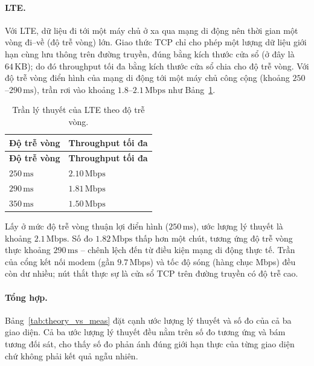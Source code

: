 \paragraph{LTE.}
Với LTE, dữ liệu đi tới một máy chủ ở xa qua mạng di động nên thời gian một vòng đi--về (độ trễ vòng) lớn. Giao thức TCP chỉ cho phép một lượng dữ liệu giới hạn cùng lưu thông trên đường truyền, đúng bằng kích thước cửa sổ (ở đây là $64\,\text{KB}$); do đó throughput tối đa bằng kích thước cửa sổ chia cho độ trễ vòng. Với độ trễ vòng điển hình của mạng di động tới một máy chủ công cộng (khoảng $250$--$290\,\text{ms}$), trần rơi vào khoảng $1{.}8$--$2{.}1\,\text{Mbps}$ như Bảng~\ref{tab:lte_theory}.

\begin{longtable}{|p{4cm}|p{4cm}|}
    \caption{Trần lý thuyết của LTE theo độ trễ vòng.}
    \label{tab:lte_theory} \\
    \hline
    \textbf{Độ trễ vòng} & \textbf{Throughput tối đa} \\ \hline
    \endfirsthead
    \hline
    \textbf{Độ trễ vòng} & \textbf{Throughput tối đa} \\ \hline
    \endhead
    \hline
    \endfoot
    \endlastfoot
    $250\,\text{ms}$ & $2{.}10\,\text{Mbps}$ \\ \hline
    $290\,\text{ms}$ & $1{.}81\,\text{Mbps}$ \\ \hline
    $350\,\text{ms}$ & $1{.}50\,\text{Mbps}$ \\ \hline
\end{longtable}

Lấy ở mức độ trễ vòng thuận lợi điển hình ($250\,\text{ms}$), ước lượng lý thuyết là khoảng $2{.}1\,\text{Mbps}$. Số đo $1{.}82\,\text{Mbps}$ thấp hơn một chút, tương ứng độ trễ vòng thực khoảng $290\,\text{ms}$ -- chênh lệch đến từ điều kiện mạng di động thực tế. Trần của cổng kết nối modem (gần $9{.}7\,\text{Mbps}$) và tốc độ sóng (hàng chục Mbps) đều còn dư nhiều; nút thắt thực sự là cửa sổ TCP trên đường truyền có độ trễ cao.

\paragraph{Tổng hợp.}
Bảng~\ref{tab:theory_vs_meas} đặt cạnh ước lượng lý thuyết và số đo của cả ba giao diện. Cả ba ước lượng lý thuyết đều nằm trên số đo tương ứng và bám tương đối sát, cho thấy số đo phản ánh đúng giới hạn thực của từng giao diện chứ không phải kết quả ngẫu nhiên.


